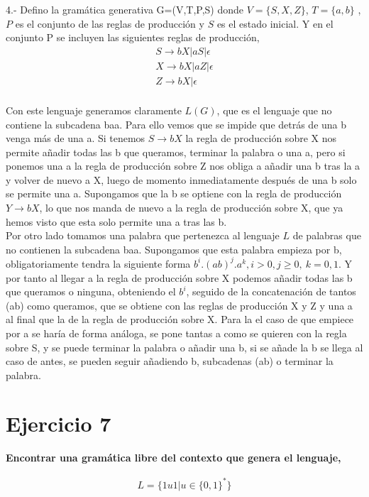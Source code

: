 \documentclass[a4paper,11pt]{article}
\begin{document}
4.- Defino la gramática generativa G=(V,T,P,S) donde $V=\{S,X,Z\}$, $T=\{a,b\}$ , $P$ es el conjunto de las reglas de producción y $S$ es el estado inicial. Y en el conjunto P se incluyen las siguientes reglas de producción, 
\begin{align*}
S \rightarrow bX|aS|\epsilon \\
X \rightarrow bX|aZ|\epsilon \\
Z \rightarrow bX|\epsilon	 \\
\end{align*}

Con este lenguaje generamos claramente $L(G)$, que es el lenguaje que no contiene la subcadena baa. Para ello vemos que se impide que detrás de una b venga más de una a. Si tenemos $S\rightarrow bX$ la regla de producción sobre X nos permite añadir todas las b que queramos, terminar la palabra o una a, pero si ponemos una a la regla de producción sobre Z nos obliga a añadir una b tras la a y volver de nuevo a X, luego de momento inmediatamente después de una b solo se permite una a. Supongamos que la b se optiene con la regla de producción $Y \rightarrow bX$, lo que nos manda de nuevo a la regla de producción sobre X, que ya hemos visto que esta solo permite una a tras las b. \\

Por otro lado tomamos una palabra que pertenezca al lenguaje $L$ de palabras que no contienen la subcadena baa. Supongamos que esta palabra empieza por b, obligatoriamente tendra la siguiente forma $b^i.(ab)^j.a^k, i > 0,j \geq 0, \> k=0,1$. Y por tanto al llegar a la regla de producción sobre X podemos añadir todas las b que queramos o ninguna, obteniendo el $b^i$, seguido de la concatenación de tantos (ab) como queramos, que se obtiene con las reglas de producción X y Z y una a al final que la de la regla de producción sobre X. Para la el caso de que empiece por a se haría de forma análoga, se pone tantas a como se quieren con la regla sobre S, y se puede terminar la palabra o añadir una b, si se añade la b se llega al caso de antes, se pueden seguir añadiendo b, subcadenas (ab) o terminar la palabra.

\section{Ejercicio 7}
\textbf{Encontrar una gramática libre del contexto que genera el lenguaje,}

\begin{align*}
L = \{1u1 | u\in\{0,1\}^*\}
\end{align*}
\end{document}
